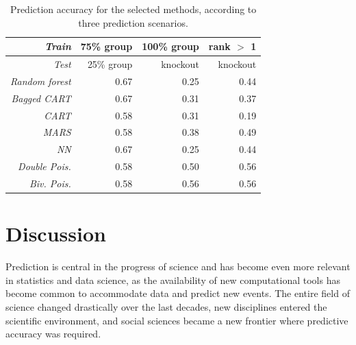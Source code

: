 \documentclass{statsoc}
\begin{document}
\begin{center}
\begin{table}
\caption{Prediction accuracy for the selected methods, according to three prediction  scenarios.}
\begin{tabular}{|r|rrr|}
\hline 
 \emph{Train}& 75\% group  & 100\% group  & rank $>$ 1   \\ 
  \hline
\emph{Test} & 25\% group & knockout & knockout\\ 
  \hline
\emph{Random forest} & 0.67 & 0.25 & 0.44 \\ 
  \emph{Bagged CART} & 0.67 & 0.31 & 0.37  \\ 
  \emph{CART} & 0.58 & 0.31 & 0.19  \\ 
  \emph{MARS} & 0.58 & 0.38 & 0.49 \\ 
  \emph{NN} & 0.67 & 0.25 & 0.44  \\ 
  \emph{Double Pois.} & 0.58 & 0.50 & 0.56  \\ 
  \emph{Biv. Pois.} & 0.58 & 0.56 & 0.56  \\ 
   \hline
\end{tabular}
\end{table}
\end{center}
%


\section{Discussion}
\label{sec:concl}

Prediction is central in the progress of science and has become even more relevant in statistics and data science, as the availability of new 
computational tools has become common to accommodate data and predict new events. The entire field of science changed drastically over the last 
decades, new disciplines entered the scientific environment, and social sciences became a new frontier where predictive accuracy was required. 
\end{document}
